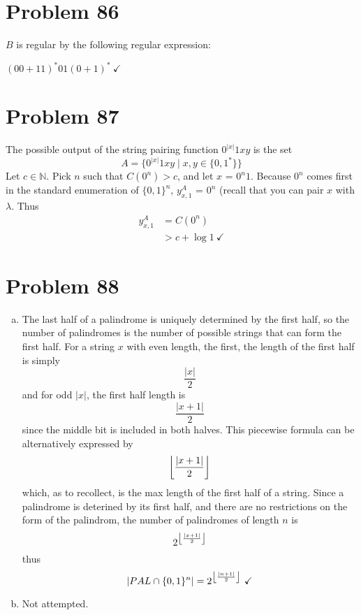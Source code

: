 \documentclass[11pt]{article}
\DeclarePairedDelimiter\floor{\lfloor}{\rfloor}
\begin{document}
\section*{Problem 86} $B$ is regular by the following regular expression: 

$(00 + 11)^* 01 (0+1)^* \ \checkmark$


\section*{Problem 87}

The possible output of the string pairing function $0^{|x|}1xy$ is the set
	\[A = \{0^{|x|}1xy \mid x,y \in \{0,1^*\}\}\]
Let $c \in \mathbb{N}$.
Pick $n$ such that $C(0^n) > c$, and let $x$ = $0^n1$.
Because $0^n$ comes first in the standard enumeration of $\{0,1\}^n$, $y_{x,1} ^A$ = $0^n$ (recall that you can pair $x$ with $\lambda$.
Thus
	\begin{align*}
		y_{x,1} ^A &= C(0^n) \\
		&> c + \log 1 \ \checkmark
	\end{align*}


\section*{Problem 88}
\begin{enumerate}[(a)]
	\item The last half of a palindrome is uniquely determined by the first half, so the number of palindromes is the number of possible strings that can form the first half. 
	For a string $x$ with even length, the first, the length of the first half is simply 
		\[\frac{|x|}{2} \] 
	and for odd $|x|$, the first half length is
		\[\frac{|x+1|}{2} \]
	since the middle bit is included in both halves.
	This piecewise formula can be alternatively expressed by
		\[\floor*{ \frac{|x+1|}{2} } \]
	which, as to recollect, is the max length of the first half of a string.
	Since a palindrome is deterined by its first half, and there are no restrictions on the form of the palindrom, the number of palindromes of length $n$ is 
		\[2^{\floor*{ \frac{|x+1|}{2} }} \]
	thus
		\[ |PAL \cap \{0,1\}^n| = 2^{\floor*{ \frac{|n+1|}{2} }}\ \checkmark\]

	\item  Not attempted.


\end{enumerate}
\end{document}

